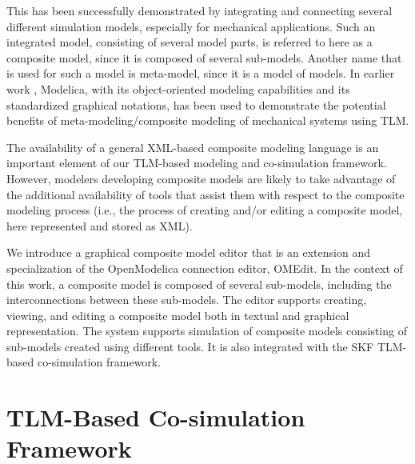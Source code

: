 This has been successfully demonstrated by integrating and connecting several different simulation
models, especially for mechanical applications. Such an integrated model, consisting of several model parts,
is referred to here as a composite model, since it is composed of several sub-models. Another name that is used for such a
model is meta-model, since it is a model of models. In earlier work \cite{tlmalexander05,tlmsiemers06}, Modelica, with its object-oriented modeling capabilities and its standardized graphical notations, has been used to demonstrate the potential benefits of meta-modeling/composite modeling of
mechanical systems using TLM.

The availability of a general XML-based composite modeling language \cite{tlmalexander05} is an
important element of our TLM-based modeling and co-simulation framework. However, modelers
developing composite models are likely to take advantage of the additional availability of tools that
assist them with respect to the composite modeling process (i.e., the process of creating and/or editing a
composite model, here represented and stored as XML). 

We introduce a graphical composite model editor that is an extension and specialization of the
OpenModelica connection editor, OMEdit. In the context of this work, a composite
model is composed of several sub-models, including the interconnections between these sub-models. 
The editor supports creating, viewing, and editing a composite model both in textual and graphical representation. 
The system supports simulation of composite models consisting of sub-models created using different tools. It is also integrated
with the SKF TLM-based co-simulation framework.

\section{TLM-Based Co-simulation Framework}
\label{sec:tlmframework}

